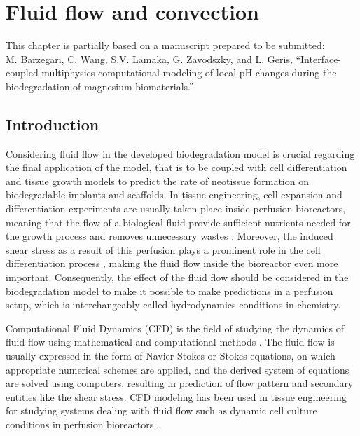 \chapter{Fluid flow and convection}\label{ch:fluid}

\begin{shaded}
This chapter is partially based on a manuscript prepared to be submitted:\\
M. Barzegari, C. Wang, S.V. Lamaka, G. Zavodszky, and L. Geris, ``Interface-coupled multiphysics computational modeling of local pH changes during the biodegradation of magnesium biomaterials.''
\end{shaded}

\section{Introduction}

Considering fluid flow in the developed biodegradation model is crucial regarding the final application of the model, that is to be coupled with cell differentiation and tissue growth models to predict the rate of neotissue formation on biodegradable implants and scaffolds. In tissue engineering, cell expansion and differentiation experiments are usually taken place inside perfusion bioreactors, meaning that the flow of a biological fluid provide sufficient nutrients needed for the growth process and removes unnecessary wastes \cite{Sikavitsas2005,Grayson2010,Sonnaert2014}. Moreover, the induced shear stress as a result of this perfusion plays a prominent role in the cell differentiation process \cite{Song2013,McCoy2012,Rauh2011,Papantoniou2013}, making the fluid flow inside the bioreactor even more important. Consequently, the effect of the fluid flow should be considered in the biodegradation model to make it possible to make predictions in a perfusion setup, which is interchangeably called hydrodynamics conditions in chemistry.

Computational Fluid Dynamics (CFD) is the field of studying the dynamics of fluid flow using mathematical and computational methods \cite{H.Versteeg2007,Sharma2022}. The fluid flow is usually expressed in the form of Navier-Stokes or Stokes equations, on which appropriate numerical schemes are applied, and the derived system of equations are solved using computers, resulting in prediction of flow pattern and secondary entities like the shear stress. CFD modeling has been used in tissue engineering for studying systems dealing with fluid flow such as dynamic cell culture conditions in perfusion bioreactors \cite{Hutmacher2008, Hossain2012,Patrachari2012}.

